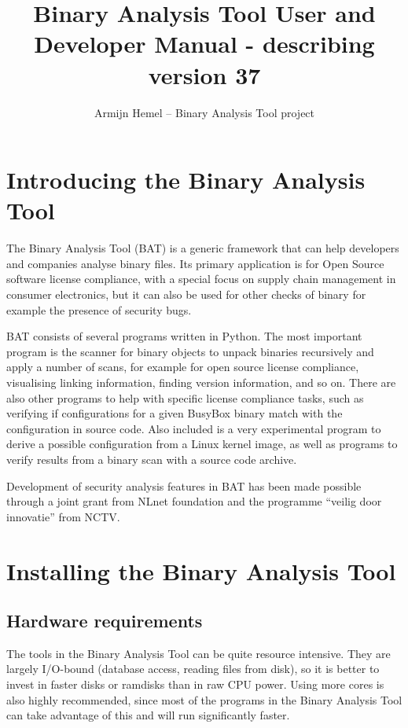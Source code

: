 \documentclass[10pt,a4paper]{article}
\author{Armijn Hemel -- Binary Analysis Tool project}
\title{Binary Analysis Tool User and Developer Manual - describing version 37}
\begin{document}
\maketitle
\thispagestyle{empty}

\tableofcontents

\section{Introducing the Binary Analysis Tool}

The Binary Analysis Tool (BAT) is a generic framework that can help developers
and companies analyse binary files. Its primary application is for Open Source
software license compliance, with a special focus on supply chain management
in consumer electronics, but it can also be used for other checks of binary
for example the presence of security bugs.

BAT consists of several programs written in Python. The most important program
is the scanner for binary objects to unpack binaries recursively and apply a
number of scans, for example for open source license compliance, visualising
linking information, finding version information, and so on. There are also
other programs to help with specific license compliance tasks, such as
verifying if configurations for a given BusyBox binary match with the
configuration in source code. Also included is a very experimental program to
derive a possible configuration from a Linux kernel image, as well as programs
to verify results from a binary scan with a source code archive.

Development of security analysis features in BAT has been made possible through
a joint grant from NLnet foundation and the programme ``veilig door innovatie''
from NCTV.

\section{Installing the Binary Analysis Tool}

\subsection{Hardware requirements}

The tools in the Binary Analysis Tool can be quite resource intensive. They
are largely I/O-bound (database access, reading files from disk), so it is
better to invest in faster disks or ramdisks than in raw CPU power. Using more
cores is also highly recommended, since most of the programs in the Binary
Analysis Tool can take advantage of this and will run significantly faster.
\end{document}
